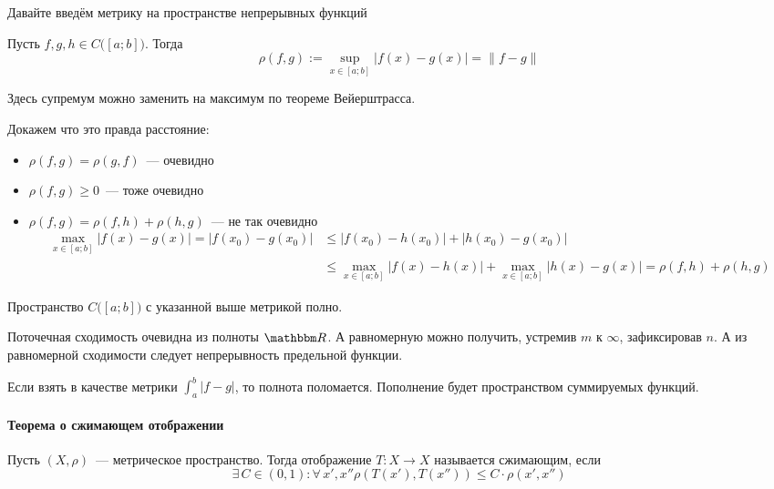 \documentclass[12pt,timbord]{../../../notes}
\begin{document}
\begin{itaux}
  Давайте введём метрику на пространстве непрерывных функций
  \begin{defn}\label{defn:diffspace::banach::cont}
    Пусть $f, g, h \in C\bigl([a;b]\bigr)$. Тогда 
    \[
      \rho(f,g) := \sup_{x\in [a;b]} |f(x) - g(x)| = \|f - g\|
    \]
  \end{defn}
  Здесь супремум можно заменить на максимум по теореме Вейерштрасса.

  Докажем что это правда расстояние:
  \begin{itemize}
    \item $\rho(f,g) =\rho (g,f)$~--- очевидно
    \item $\rho(f,g) \geqslant 0$~--- тоже очевидно
    \item $\rho(f,g) = \rho(f,h) + \rho(h,g) $~--- не так очевидно
      \[
        \begin{split}
          \max_{x\in [a;b]}|f(x)-g(x)| = |f(x_0) - g(x_0) | 
          &\leqslant |f(x_0) - h(x_0)| + |h(x_0)-g(x_0)|\\
          &\leqslant \max_{x\in [a;b]}|f(x) - h(x)| + \max_{x\in [a;b]}|h(x)-g(x)|
          = \rho(f,h) + \rho(h,g)
        \end{split}
      \]
  \end{itemize}

  \begin{prop}\label{prop:diffspace::banach::contcomp}
    Пространство $C\bigl([a;b]\bigr)$ с указанной выше метрикой полно.
  \end{prop}
  \begin{itlproof}
    Поточечная сходимость очевидна из полноты $\R$. А равномерную можно получить, устремив $m$ к
    $\infty$, зафиксировав $n$. А из равномерной сходимости следует непрерывность предельной
    функции.
  \end{itlproof}
  \begin{rem*}
    Если взять в качестве метрики $\int_a^b |f-g|$, то полнота поломается. Пополнение будет
    пространством суммируемых функций.
  \end{rem*}
\end{itaux}
\paragraph{Теорема о сжимающем отображении}
\label{par:diffspace::contrmap}

\begin{defn}\label{defn:diffspace::contrmap}
  Пусть $(X, \rho)$~--- метрическое пространство. Тогда отображение $T\colon X \to X$ называется
  сжимающим, если 
  \[
    \exists\, C \in (0,1) \colon \forall\, x',x'' \rho(T(x'), T(x'')) 
    \leqslant C\cdot \rho(x',x'')
  \]
\end{defn}
\end{document}
